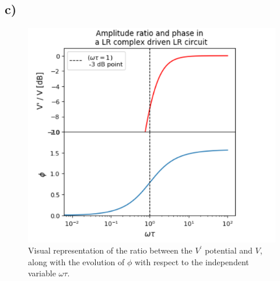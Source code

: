 \documentclass[
	12pt,
	]{article}
\newcommand{\p}{\prime}
\theoremstyle{definition}
\theoremstyle{definition}
\theoremstyle{definition}
\theoremstyle{definition}
\theoremstyle{definition}
\theoremstyle{example}
\theoremstyle{note}
\theoremstyle{remark}
\theoremstyle{example}
\begin{document}
		\subsection*{c) }
			\begin{figure}[h]
						\centering
							\includegraphics[width=0.8\linewidth]{plot_phys241_ass3_2.png}
							\caption{Visual representation of the ratio between the $V^{\p}$ potential and $V$, along with the evolution of $\phi$ with respect to the independent variable $\omega \tau$.}					
						\end{figure}
			
	
\end{document}
